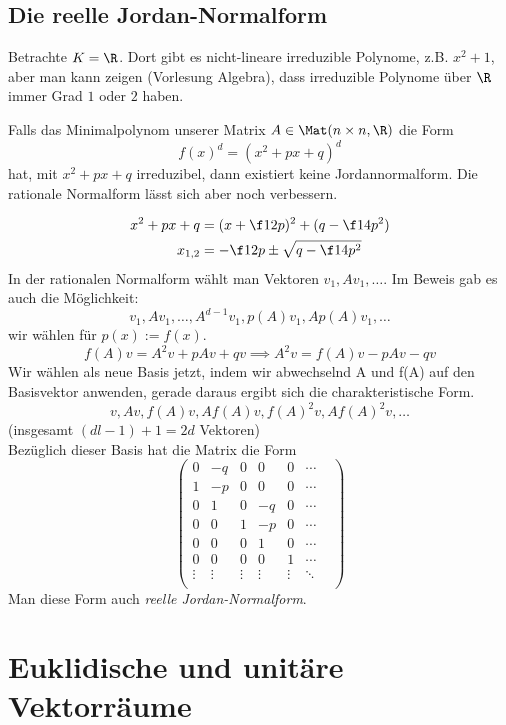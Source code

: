 \documentclass[a4paper, 10pt]{scrbook}
\begin{document}
\section{Die reelle Jordan-Normalform}


Betrachte $K=\R$.
Dort gibt es nicht-lineare irreduzible Polynome, z.B. $x^2+1$, aber man kann zeigen (Vorlesung Algebra), dass irreduzible Polynome über $\R$ immer Grad $1$ oder $2$ haben.

Falls das Minimalpolynom unserer Matrix $A \in \Mat(n\times n, \R)$  die Form
\[
	f(x)^d = (x^2+px+q)^d
\]
hat, mit $x^2+px+q$ irreduzibel, dann existiert keine Jordannormalform.
Die rationale Normalform lässt sich aber noch verbessern.

\begin{align*}
	x^2+px+q &= (x+\f 12 p)^2 + (q-\f 14 p^2)\\
	 x_{1,2} &= -\f 12 p \pm \sqrt{q-\f 14 p^2}
\end{align*}
In der rationalen Normalform wählt man Vektoren $v_1, Av_1, \dotsc$.
Im Beweis gab es auch die Möglichkeit:
\[
	v_1, Av_1, \dotsc, A^{d-1}v_1, p(A)v_1, Ap(A)v_1, \dotsc
\]
wir wählen für $p(x) := f(x)$.
\[
	f(A)v = A^2v +pAv + qv \implies A^2v = f(A)v - pAv -qv
\]
Wir wählen als neue Basis jetzt, indem wir abwechselnd A und f(A) auf den Basisvektor anwenden, gerade daraus ergibt sich die charakteristische Form.
\[
	v, Av, f(A)v, Af(A)v, f(A)^2v, Af(A)^2v,\dotsc
\]
(insgesamt $(dl-1)+1 = 2d$ Vektoren)\\
Bezüglich dieser Basis hat die Matrix die Form
\[
	\begin{pmatrix}
		0 & -q & 0 & 0  & 0 & \cdots \\
		1 & -p & 0 & 0  & 0 & \cdots\\
		0 & 1  & 0 & -q & 0 & \cdots\\
		0 & 0  & 1 & -p & 0 & \cdots\\
		0 & 0  & 0 & 1  & 0 & \cdots\\
		0 & 0  & 0 & 0  & 1 & \cdots\\
		\vdots & \vdots & \vdots & \vdots & \vdots & \ddots & \\
	\end{pmatrix}
\]
Man diese Form auch \emph{reelle Jordan-Normalform}.




\chapter{Euklidische und unitäre Vektorräume}
\end{document}
